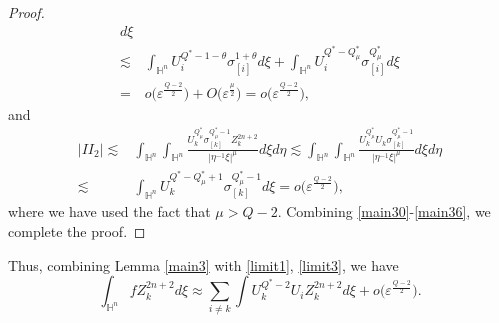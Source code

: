 \documentclass[11pt]{article}
\begin{document}
\begin{proof}
\begin{align}
d\xi \nonumber\\
\lesssim&%
\int_{\mathbb{H}^{n}}U_i^{Q^{\ast}-1-\theta}\sigma^{1+\theta}_{[i]}d\xi +
\int_{\mathbb{H}^{n}}U_i^{Q^{\ast}-Q_\mu^*}\sigma_{[i]}^{Q^{\ast}_{\mu}}d\xi \nonumber\\
=&o\Big(\varepsilon^{\frac{Q-2}{2}}\Big)+O\big(\varepsilon^{\frac{\mu}{2}}\big)=o\Big(\varepsilon^{\frac{Q-2}{2}}\Big),
\end{align}
and
\begin{align}\label{main36}
  |II_2| \lesssim&
  \int_{\mathbb{H}^{n}}\int_{\mathbb{H}^{n}}\frac{U_k^{Q^{\ast}_{\mu}}
\sigma_{[k]}^{Q^{\ast}_{\mu}-1}Z_k^{2n+2}}
{|\eta^{-1}\xi|^{\mu}}d\xi{d}\eta\lesssim
  \int_{\mathbb{H}^{n}}\int_{\mathbb{H}^{n}}\frac{U_k^{Q^{\ast}_{\mu}}U_k
\sigma_{[k]}^{Q^{\ast}_{\mu}-1}}
{|\eta^{-1}\xi|^{\mu}}d\xi{d}\eta
\nonumber\\ \lesssim&\int_{\mathbb{H}^{n}}U_k^{Q^{\ast}-Q_\mu^*+1}\sigma_{[k]}^{Q^{\ast}_{\mu}-1}d\xi=o\Big(\varepsilon^{\frac{Q-2}{2}}\Big),
\end{align}
where we have used the fact that $\mu>Q-2$. Combining \eqref{main30}-\eqref{main36}, we complete the proof.
\end{proof}
Thus, combining Lemma \ref{main3} with \eqref{limit1}, \eqref{limit3}, we have
\begin{equation}\label{main37}
  \int_{\mathbb{H}^n } f Z_k^{2n+2}  d\xi\approx \sum_{i\neq k}\int U_k^{Q^*-2}U_i Z_k^{2n+2} d\xi +o\Big(\varepsilon^{\frac{Q-2}{2}}\Big).
\end{equation}
\end{document}
